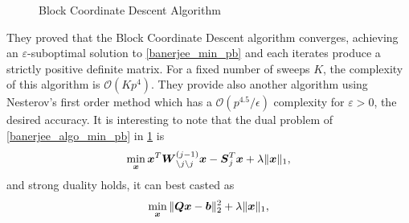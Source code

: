 \begin{figure}
\begin{center}
   \caption{Block Coordinate Descent Algorithm}
   \label{fig:banerjee_block_algo}

\end{center}
\end{figure}
They proved that the Block Coordinate Descent algorithm converges, achieving an $\varepsilon$-suboptimal solution to \cref{banerjee_min_pb} and each iterates produce a strictly positive definite matrix. For a fixed number of sweeps $K$, the complexity of this algorithm is $\mathcal O (Kp^4)$. They provide also another algorithm using Nesterov's first order method which has a $\mathcal O(p^{4.5}/\epsilon)$ complexity for $\varepsilon > 0$, the desired accuracy. It is interesting to note that the dual problem of \cref{banerjee_algo_min_pb} in \cref{fig:banerjee_block_algo} is 
\begin{equation}
  \min_{\boldsymbol x} \boldsymbol x^T\boldsymbol W_{\setminus j \setminus j}^{(j-1)}\boldsymbol x - \boldsymbol S_j^T\boldsymbol x + \lambda\|\boldsymbol x\|_1,
\end{equation}
and strong duality holds, it can best casted as
\begin{equation}
\label{banerjee_dual_lasso}
  \min_{\boldsymbol x} \|\boldsymbol Q\boldsymbol x - \boldsymbol b\|_2^2 + \lambda\|\boldsymbol x\|_1,
\end{equation}
